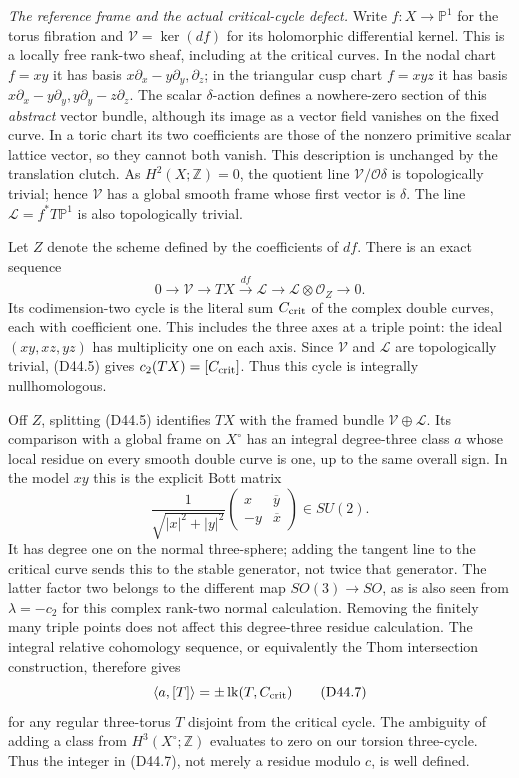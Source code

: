 \emph{The reference frame and the actual critical-cycle defect.}
Write $f:X\to\mathbb P^1$ for the torus fibration and
$\mathcal V=\ker(df)$ for its holomorphic differential kernel.
This is a locally free rank-two sheaf, including at the critical
curves. In the nodal chart $f=xy$ it has basis
$x\partial_x-y\partial_y,\partial_z$; in the triangular cusp
chart $f=xyz$ it has basis
$x\partial_x-y\partial_y,y\partial_y-z\partial_z$.
The scalar $\delta$-action defines a nowhere-zero section of this
\emph{abstract} vector bundle, although its image as a vector
field vanishes on the fixed curve. In a toric chart its two
coefficients are those of the nonzero primitive scalar lattice
vector, so they cannot both vanish. This description is unchanged
by the translation clutch.
As $H^2(X;\mathbb Z)=0$, the quotient line $\mathcal V/\mathcal O\delta$
is topologically trivial; hence $\mathcal V$ has a global smooth
frame whose first vector is $\delta$. The line
$\mathcal L=f^*T\mathbb P^1$ is also topologically trivial.

Let $Z$ denote the scheme defined by the coefficients of $df$.
There is an exact sequence
\[
 0\longrightarrow\mathcal V\longrightarrow TX
  \xrightarrow{df}\mathcal L
  \longrightarrow\mathcal L\otimes\mathcal O_Z
  \longrightarrow0.                                         \tag{D44.5}
\]
Its codimension-two cycle is the literal sum $C_{\rm crit}$ of
the complex double curves, each with coefficient one. This
includes the three axes at a triple point: the ideal
$(xy,xz,yz)$ has multiplicity one on each axis. Since
$\mathcal V$ and $\mathcal L$ are topologically trivial,
(D44.5) gives $c_2(TX)=[C_{\rm crit}]$. Thus this cycle is
integrally nullhomologous.

Off $Z$, splitting (D44.5) identifies $TX$ with the framed
bundle $\mathcal V\oplus\mathcal L$. Its comparison with a
global frame on $X^\circ$ has an integral degree-three class
$a$ whose local residue on every smooth double curve is one,
up to the same overall sign. In the model $xy$ this is the
explicit Bott matrix
\[
 \frac1{\sqrt{|x|^2+|y|^2}}
 \begin{pmatrix}x&\overline y\\-y&\overline x\end{pmatrix}
       \in SU(2).                                            \tag{D44.6}
\]
It has degree one on the normal three-sphere; adding the
tangent line to the critical curve sends this to the stable
generator, not twice that generator. The latter factor two
belongs to the different map $SO(3)\to SO$, as is also seen
from $\lambda=-c_2$ for this complex rank-two normal calculation.
Removing the finitely many triple points does not affect this
degree-three residue calculation. The integral relative
cohomology sequence, or equivalently the Thom intersection
construction, therefore gives
\[
 \langle a,[T]\rangle
      =\pm\operatorname{lk}(T,C_{\rm crit})                   \tag{D44.7}
\]
for any regular three-torus $T$ disjoint from the critical
cycle. The ambiguity of adding a class from $H^3(X^\circ;\mathbb Z)$
evaluates to zero on our torsion three-cycle. Thus the integer
in (D44.7), not merely a residue modulo $c$, is well defined.

